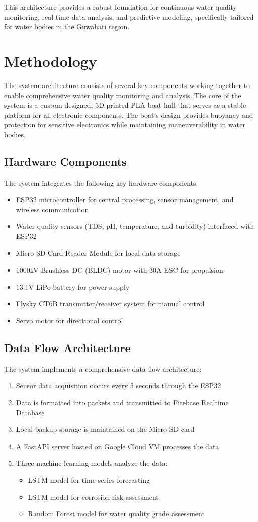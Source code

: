 \documentclass[conference]{IEEEtran}
\begin{document}
This architecture provides a robust foundation for continuous water quality monitoring, real-time data analysis, and predictive modeling, specifically tailored for water bodies in the Guwahati region.

\section{Methodology}
The system architecture consists of several key components working together to enable comprehensive water quality monitoring and analysis. The core of the system is a custom-designed, 3D-printed PLA boat hull that serves as a stable platform for all electronic components. The boat's design provides buoyancy and protection for sensitive electronics while maintaining maneuverability in water bodies.

\subsection{Hardware Components}
The system integrates the following key hardware components:
\begin{itemize}
\item ESP32 microcontroller for central processing, sensor management, and wireless communication
\item Water quality sensors (TDS, pH, temperature, and turbidity) interfaced with ESP32
\item Micro SD Card Reader Module for local data storage
\item 1000kV Brushless DC (BLDC) motor with 30A ESC for propulsion
\item 13.1V LiPo battery for power supply
\item Flysky CT6B transmitter/receiver system for manual control
\item Servo motor for directional control
\end{itemize}

\subsection{Data Flow Architecture}
The system implements a comprehensive data flow architecture:
\begin{enumerate}
\item Sensor data acquisition occurs every 5 seconds through the ESP32
\item Data is formatted into packets and transmitted to Firebase Realtime Database
\item Local backup storage is maintained on the Micro SD card
\item A FastAPI server hosted on Google Cloud VM processes the data
\item Three machine learning models analyze the data:
    \begin{itemize}
    \item LSTM model for time series forecasting
    \item LSTM model for corrosion risk assessment
    \item Random Forest model for water quality grade assessment
    \end{itemize}
\end{enumerate}
\end{document}
